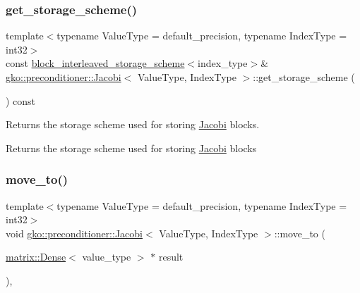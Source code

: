 \subsubsection{\texorpdfstring{get\+\_\+storage\+\_\+scheme()}{get\_storage\_scheme()}}
{\footnotesize\ttfamily template$<$typename Value\+Type  = default\+\_\+precision, typename Index\+Type  = int32$>$ \\
const \hyperlink{structgko_1_1preconditioner_1_1block__interleaved__storage__scheme}{block\+\_\+interleaved\+\_\+storage\+\_\+scheme}$<$index\+\_\+type$>$\& \hyperlink{classgko_1_1preconditioner_1_1Jacobi}{gko\+::preconditioner\+::\+Jacobi}$<$ Value\+Type, Index\+Type $>$\+::get\+\_\+storage\+\_\+scheme (\begin{DoxyParamCaption}{ }\end{DoxyParamCaption}) const\hspace{0.3cm}{\ttfamily [noexcept]}}



Returns the storage scheme used for storing \hyperlink{classgko_1_1preconditioner_1_1Jacobi}{Jacobi} blocks. 

\begin{DoxyReturn}{Returns}
the storage scheme used for storing \hyperlink{classgko_1_1preconditioner_1_1Jacobi}{Jacobi} blocks 
\end{DoxyReturn}
\mbox{\label{classgko_1_1preconditioner_1_1Jacobi_a6d5e28b3033772bfc6c96fbe3caca003}} 
\subsubsection{\texorpdfstring{move\+\_\+to()}{move\_to()}}
{\footnotesize\ttfamily template$<$typename Value\+Type  = default\+\_\+precision, typename Index\+Type  = int32$>$ \\
void \hyperlink{classgko_1_1preconditioner_1_1Jacobi}{gko\+::preconditioner\+::\+Jacobi}$<$ Value\+Type, Index\+Type $>$\+::move\+\_\+to (\begin{DoxyParamCaption}\item[{\hyperlink{classgko_1_1matrix_1_1Dense}{matrix\+::\+Dense}$<$ value\+\_\+type $>$ $\ast$}]{result }\end{DoxyParamCaption})\hspace{0.3cm}{\ttfamily [override]}, {\ttfamily [virtual]}}



